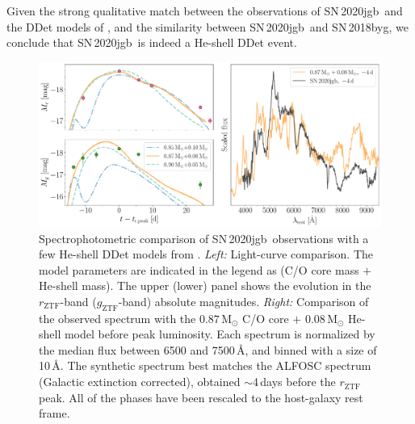 \documentclass[twocolumn]{aastex631}
\newcommand{\sn}{SN\,2020jgb}
\begin{document}
Given the strong qualitative match between the observations of \sn\ and the DDet models of \citet{polin_observational_2019}, and the similarity between \sn\ and SN\,2018byg, we conclude that \sn\ is indeed a He-shell DDet event. 

\begin{figure}
    \centering
    \includegraphics[width=\textwidth]{model.pdf}
    \caption{Spectrophotometric comparison of \sn\ observations with a few He-shell DDet models from \citet{polin_observational_2019}. {\it Left:} Light-curve comparison. The model parameters are indicated in the legend as (C/O core mass $+$ He-shell mass). The upper (lower) panel shows the evolution in the $r_\mathrm{ZTF}$-band ($g_\mathrm{ZTF}$-band) absolute magnitudes. {\it Right:} Comparison of the observed spectrum with the $0.87\,\mathrm{M_\odot}$ C/O core $+$ $0.08\,\mathrm{M_\odot}$ He-shell model before peak luminosity. Each spectrum is normalized by the median flux between 6500 and 7500\,\AA, and binned with a size of 10\,\AA. The synthetic spectrum best matches the ALFOSC spectrum (Galactic extinction corrected), obtained $\sim$4\,days before the $r_\mathrm{ZTF}$ peak. All of the phases have been rescaled to the host-galaxy rest frame.}
    \label{fig:model}
\end{figure}
\end{document}
